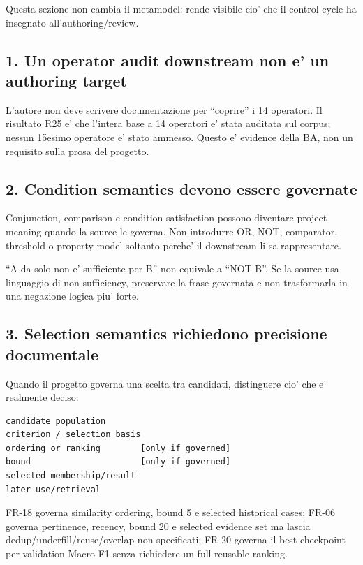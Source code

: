 \documentclass[11pt,a4paper]{article}
\begin{document}
Questa sezione non cambia il metamodel: rende visibile cio' che il control cycle ha insegnato all'authoring/review.

\subsection{1. Un operator audit downstream non e' un authoring target}
\holdouttag
L'autore non deve scrivere documentazione per ``coprire'' i 14 operatori. Il risultato R25 e' che l'intera base a 14 operatori e' stata auditata sul corpus; nessun 15esimo operatore e' stato ammesso. Questo e' evidence della BA, non un requisito sulla prosa del progetto.

\subsection{2. Condition semantics devono essere governate}
\holdouttag
Conjunction, comparison e condition satisfaction possono diventare project meaning quando la source le governa. Non introdurre OR, NOT, comparator, threshold o property model soltanto perche' il downstream li sa rappresentare.

\begin{ddtaopen}[title={Negative non-sufficiency}]
``A da solo non e' sufficiente per B'' non equivale a ``NOT B''. Se la source usa linguaggio di non-sufficiency, preservare la frase governata e non trasformarla in una negazione logica piu' forte.
\end{ddtaopen}

\subsection{3. Selection semantics richiedono precisione documentale}
\holdouttag
Quando il progetto governa una scelta tra candidati, distinguere cio' che e' realmente deciso:
\begin{lstlisting}
candidate population
criterion / selection basis
ordering or ranking        [only if governed]
bound                      [only if governed]
selected membership/result
later use/retrieval
\end{lstlisting}

\begin{ddtaexample}[title={DermaTriage FR-18 / FR-06 / FR-20}]
FR-18 governa similarity ordering, bound 5 e selected historical cases; FR-06 governa pertinence, recency, bound 20 e selected evidence set ma lascia dedup/underfill/reuse/overlap non specificati; FR-20 governa il best checkpoint per validation Macro F1 senza richiedere un full reusable ranking.
\end{ddtaexample}
\end{document}
